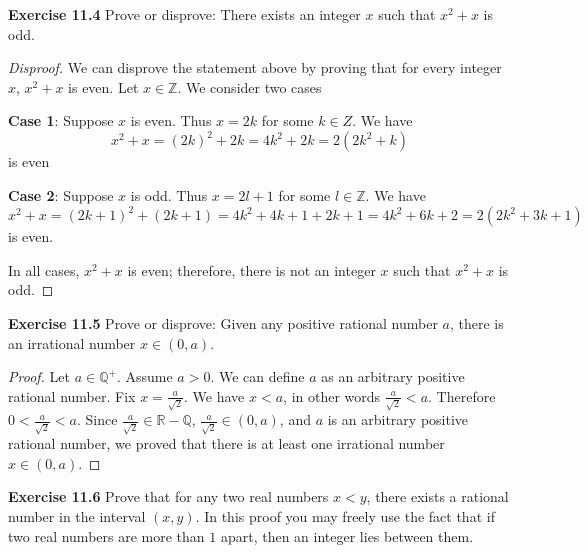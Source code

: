 \documentclass[12pt,oneside]{article}
\newenvironment{exercise}[1]{\vspace{.1in}\noindent\textbf{Exercise #1 \hspace{.05em}}}{}
\newcommand{\R}{\mathbb{R}}
\newcommand{\Z}{\mathbb{Z}}
\newcommand{\Q}{\mathbb{Q}}
\begin{document}

\begin{exercise}{11.4}
Prove or disprove: There exists an integer $x$ such that $x^2 + x$ is odd.
\end{exercise}

\begin{proof}[Disproof]
We can disprove the statement above by proving that for every integer $x$, $x^2 + x$ is even. Let $x \in \Z$. We consider two cases

\textbf{Case 1}: Suppose $x$ is even. Thus $x = 2k$ for some $k \in Z$. We have
\[x^2 + x = (2k)^2 + 2k = 4k^2 + 2k = 2(2k^2 + k)\]
is even

\textbf{Case 2}: Suppose $x$ is odd. Thus $x = 2l + 1$ for some $l \in \Z$. We have
\[x^2 + x = (2k + 1)^2 + (2k + 1) = 4k^2 + 4k + 1 + 2k + 1 = 4k^2 + 6k + 2 = 2(2k^2 + 3k + 1)\]
is even.

In all cases, $x^2 + x$ is even; therefore, there is not an integer $x$ such that $x^2 + x$ is odd.
\end{proof}



\begin{exercise}{11.5}
Prove or disprove: Given any positive rational number $a$, there is an irrational number $x \in (0,a)$.
\end{exercise}

\begin{proof}
Let $a \in \Q^+$. Assume $a > 0$. We can define $a$ as an arbitrary positive rational number. Fix $x = \frac{a}{\sqrt{2}}$. We have $x < a$, in other words $\frac{a}{\sqrt{2}} < a$. Therefore $0 < \frac{a}{\sqrt{2}} < a$. Since $\frac{a}{\sqrt{2}} \in \R - \Q$, $\frac{a}{\sqrt{2}} \in (0, a)$, and $a$ is an arbitrary positive rational number, we proved that there is at least one irrational number $x \in (0, a)$. 
\end{proof}



\begin{exercise}{11.6}
Prove that for any two real numbers $x < y$, there exists a rational number in the interval $(x, y)$. In this proof you may freely use the fact that if two real numbers are more than $1$ apart, then an integer lies between them.
\end{exercise}
\end{document}
